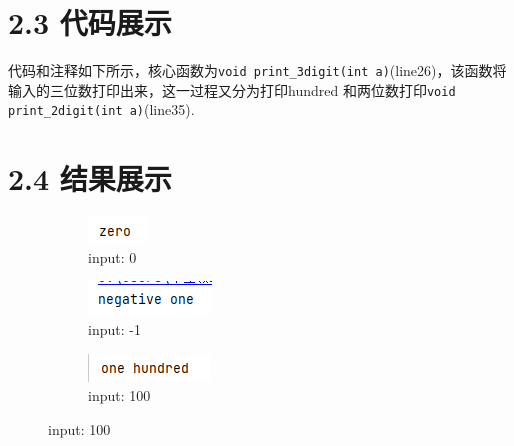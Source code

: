 \section{2.3 代码展示}

代码和注释如下所示，核心函数为\lstinline{void print_3digit(int a)}(line26)，该函数将输入的三位数打印出来，这一过程又分为打印hundred
和两位数打印\lstinline{void print_2digit(int a)}(line35).


\section{2.4 结果展示}

\begin{figure}[H]
	\centering
	\begin{subfigure}{0.13\linewidth}
		\centering
		\includegraphics[width=0.5\linewidth]{../pic/2/2.1.png}
        \caption{input: 0}
	\end{subfigure}
	\begin{subfigure}{0.17\linewidth}
		\centering
		\includegraphics[width=1\linewidth]{../pic/2/2.2.png}
        \caption{input: -1}
	\end{subfigure}
	\begin{subfigure}{0.17\linewidth}
		\centering
		\includegraphics[width=1\linewidth]{../pic/2/2.3.png}
        \caption{input: 100}
	\end{subfigure}

\end{figure}
